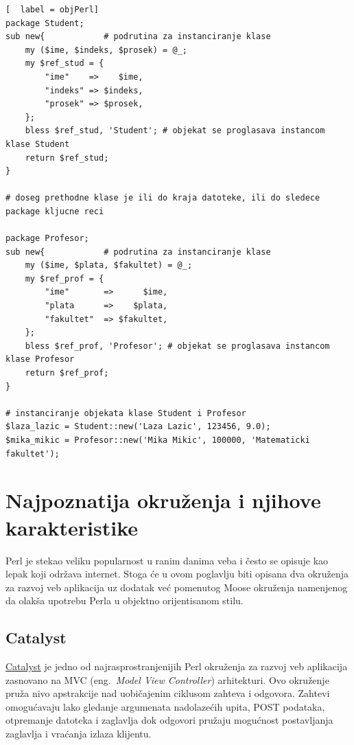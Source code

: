 \documentclass[a4paper]{article}
\begin{document}
\begin{lstlisting}[  label = objPerl]
package Student;    
sub new{            # podrutina za instanciranje klase
    my ($ime, $indeks, $prosek) = @_;
    my $ref_stud = {
        "ime"    =>    $ime,
        "indeks" => $indeks,
        "prosek" => $prosek,
    };
    bless $ref_stud, 'Student'; # objekat se proglasava instancom klase Student
    return $ref_stud;
}

# doseg prethodne klase je ili do kraja datoteke, ili do sledece package kljucne reci

package Profesor;
sub new{            # podrutina za instanciranje klase
    my ($ime, $plata, $fakultet) = @_;
    my $ref_prof = {
        "ime"       =>      $ime,
        "plata      =>    $plata,
        "fakultet"  => $fakultet,
    };
    bless $ref_prof, 'Profesor'; # objekat se proglasava instancom klase Profesor
    return $ref_prof;
}

# instanciranje objekata klase Student i Profesor
$laza_lazic = Student::new('Laza Lazic', 123456, 9.0);
$mika_mikic = Profesor::new('Mika Mikic', 100000, 'Matematicki fakultet');

\end{lstlisting}


\section{Najpoznatija okruženja i njihove karakteristike}

Perl je stekao veliku popularnost u ranim danima veba i često se opisuje kao lepak koji održava internet. Stoga će u ovom poglavlju biti opisana dva okruženja za razvoj veb aplikacija uz dodatak već pomenutog Moose okruženja namenjenog da olakša upotrebu Perla u objektno orijentisanom stilu. 

\subsection{Catalyst}

\href{http://www.catalystframework.org/}{Catalyst} je jedno od najrasprostranjenijih Perl okruženja za razvoj veb aplikacija zasnovano na MVC\cite{mvc} (eng.~{\em Model View Controller}) arhitekturi. Ovo okruženje pruža nivo apstrakcije nad uobičajenim ciklusom zahteva i odgovora. Zahtevi omogućavaju lako gledanje argumenata nadolazećih upita, POST podataka, otpremanje datoteka i zaglavlja dok odgovori pružaju mogućnost postavljanja zaglavlja i vraćanja izlaza klijentu. 
\end{document}
